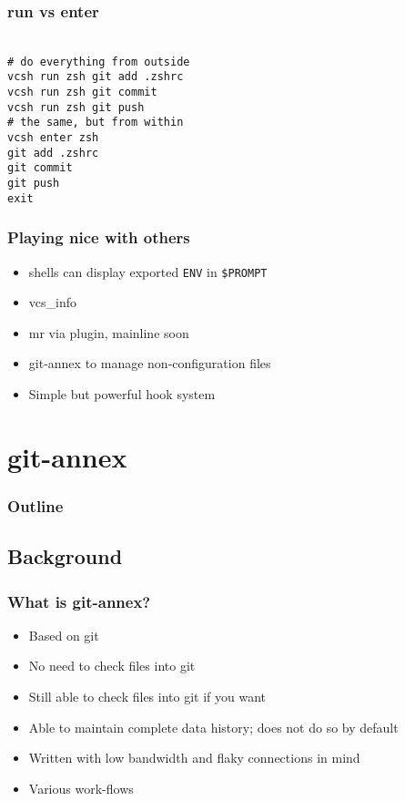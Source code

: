 \documentclass[t]{beamer}
\begin{document}
\begin{frame}
	\frametitle{run vs enter}
	\texttt{ \\
		\# do everything from outside \\
		vcsh run zsh git add .zshrc \\
		vcsh run zsh git commit \\
		vcsh run zsh git push \\
		\# the same, but from within\\
		vcsh enter zsh \\
		git add .zshrc \\
		git commit \\
		git push \\
		exit
	}
\end{frame}

\begin{frame}
	\frametitle{Playing nice with others}
	\begin{itemize}
		\item shells can display exported \texttt{ENV} in \texttt{\$PROMPT}
		\item vcs\_info
		\item mr via plugin, mainline soon
		\item git-annex to manage non-configuration files
		\item Simple but powerful hook system
	\end{itemize}
\end{frame}


\section{git-annex}

\begin{frame}
	\frametitle{Outline}
	\tableofcontents[currentsection]
\end{frame}

\subsection{Background}

\begin{frame}
	\frametitle{What is git-annex?}
	\begin{itemize}
		\item Based on git
		\item No need to check files into git
		\item Still able to check files into git if you want
		\item Able to maintain complete data history; does not do so by default
		\item Written with low bandwidth and flaky connections in mind
		\item Various work-flows
	\end{itemize}
\end{frame}
\end{document}

